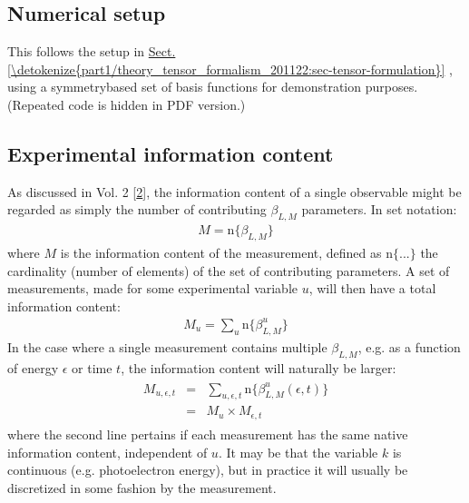 \documentclass[letterpaper,table,10pt,english]{jupyterBook}
\begin{document}
\subsection{Numerical setup}
\label{\detokenize{part1/theory_info_content_221122:numerical-setup}}
\sphinxAtStartPar
This follows the setup in \hyperref[\detokenize{part1/theory_tensor_formalism_201122:sec-tensor-formulation}]{Sect.\@ \ref{\detokenize{part1/theory_tensor_formalism_201122:sec-tensor-formulation}}} {\hyperref[\detokenize{part1/theory_tensor_formalism_201122:sec-tensor-formulation}]{}}, using a symmetry\sphinxhyphen{}based set of basis functions for demonstration purposes. (Repeated code is hidden in PDF version.)


\subsection{Experimental information content}
\label{\detokenize{part1/theory_info_content_221122:experimental-information-content}}\label{\detokenize{part1/theory_info_content_221122:sec-expt-info-content}}
\sphinxAtStartPar
As discussed in  Vol. 2 {[}\hyperlink{cite.backmatter/bibliography:id570}{2}{]}, the information content of a single observable might be regarded as simply the number of contributing \(\beta_{L,M}\) parameters. In set notation:
\begin{equation}\label{equation:part1/theory_info_content_221122:eq:BLM-set}
\begin{split}M=\mathrm{n}\{\beta_{L,M}\}\end{split}
\end{equation}
\sphinxAtStartPar
where \(M\) is the information content of the measurement, defined as
\(\mathrm{n}\{...\}\) the cardinality (number of elements) of the set of
contributing parameters. A set of measurements, made for some
experimental variable \(u\), will then have a total information content:
\begin{equation*}
\begin{split}M_{u}=\sum_{u}\mathrm{n}\{\beta_{L,M}^{u}\}\end{split}
\end{equation*}
\sphinxAtStartPar
In the case where a single measurement contains multiple \(\beta_{L,M}\),
e.g. as a function of energy \(\epsilon\) or time \(t\), the information
content will naturally be larger:
\begin{equation*}
\begin{split}\begin{aligned}
M_{u,\epsilon,t} & = & \sum_{u,\epsilon,t}\mathrm{n}\{\beta_{L,M}^{u}(\epsilon,t)\}\\
 & = & M_{u}\times M_{\epsilon,t}\end{aligned}\end{split}
\end{equation*}
\sphinxAtStartPar
where the second line pertains if each measurement has the same native
information content, independent of \(u\). It may be that the variable \(k\)
is continuous (e.g. photoelectron energy), but in practice it will
usually be discretized in some fashion by the measurement.
\end{document}
